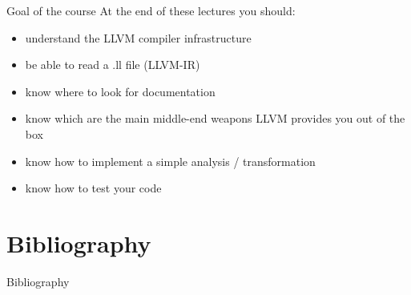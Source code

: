 \documentclass[10pt,mathserif]{beamer}
\begin{document}
\begin{frame}[t]{Goal of the course}
  At the end of these lectures you should:
  \begin{itemize}
    \vfill
    \item understand the LLVM compiler infrastructure
    \vfill
    \item be able to read a .ll file (LLVM-IR)
    \vfill
    \item know where to look for documentation
    \vfill
    \item know which are the main middle-end weapons
          LLVM provides you out of the box
    \vfill
    \item know how to implement a simple analysis / transformation
    \vfill
    \item know how to test your code
  \end{itemize}
\end{frame}

\section*{Bibliography}
\begin{frame}[allowframebreaks]{Bibliography}
\nocite{*}


\end{frame}
\end{document}

